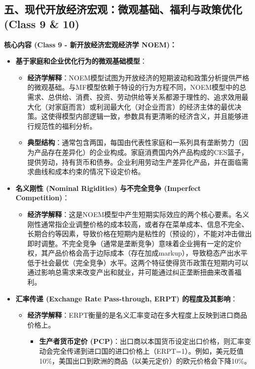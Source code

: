 \documentclass[12pt]{article}
\begin{document}
\subsection*{五、现代开放经济宏观：微观基础、福利与政策优化 (Class 9 \& 10)}

\textbf{核心内容 (Class 9 - 新开放经济宏观经济学 NOEM)：}
\begin{itemize}
    \item \textbf{基于家庭和企业优化行为的微观基础模型}：
    \begin{itemize}
        \item \textbf{经济学解释}：NOEM模型试图为开放经济的短期波动和政策分析提供严格的微观基础。与MF模型依赖于特设的行为方程不同，NOEM模型中的总需求、总供给、消费、投资、劳动供给等关系都源于理性的、追求效用最大化（对家庭而言）或利润最大化（对企业而言）的经济主体的最优决策。这使得模型内部逻辑一致，参数具有更清晰的经济含义，并且能够进行规范性的福利分析。
        \item \textbf{典型结构}：通常包含两国，每国由代表性家庭和一系列具有垄断势力（因为产品存在差异化）的企业构成。家庭消费国内外产品构成的CES篮子，提供劳动，持有货币和债券。企业利用劳动生产差异化产品，并在面临需求曲线和成本约束的情况下设定价格。
    \end{itemize}
    \item \textbf{名义刚性 (Nominal Rigidities) 与不完全竞争 (Imperfect Competition)}：
    \begin{itemize}
        \item \textbf{经济学解释}：这是NOEM模型中产生短期实际效应的两个核心要素。名义刚性通常指企业调整价格的成本较高，或者存在菜单成本、信息不完全、长期合约等因素，导致价格在短期内是粘性的（预设的），不能对冲击做出即时调整。不完全竞争（通常是垄断竞争）意味着企业拥有一定的定价权，其产品价格会高于边际成本（存在加成markup），导致稳态产出水平低于社会最优（完全竞争）水平。这两个特征使得货币政策在短期内可以通过影响总需求来改变产出和就业，并可能通过纠正垄断扭曲来改善福利。
    \end{itemize}
    \item \textbf{汇率传递 (Exchange Rate Pass-through, ERPT) 的程度及其影响}：
    \begin{itemize}
        \item \textbf{经济学解释}：ERPT衡量的是名义汇率变动在多大程度上反映到进口商品价格上。
        \begin{itemize}
            \item \textbf{生产者货币定价 (PCP)}：出口商以本国货币设定出口价格，则汇率变动会完全传递到进口国的进口价格上（ERPT=1）。例如，美元贬值10\%，美国出口到欧洲的商品（以美元定价）的欧元价格会下降10\%。

\end{itemize}
\end{itemize}
\end{itemize}
\end{document}

